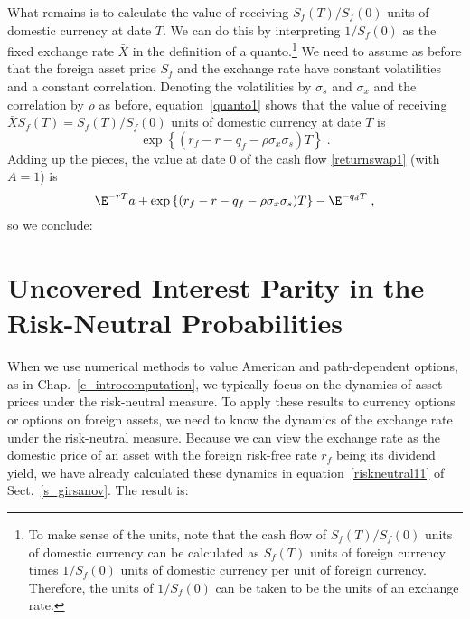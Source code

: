 What remains is to calculate the value of receiving $S_f(T)/S_f(0)$ units of domestic currency at date $T$.  We can do this by interpreting $1/S_f(0)$ as the fixed exchange rate $\bar{X}$ in the definition of a quanto.\footnote{To make sense of the units, note that the cash flow of $S_f(T)/S_f(0)$ units of domestic currency can be calculated as $S_f(T)$ units of foreign currency times $1/S_f(0)$ units of domestic currency per unit of foreign currency.  Therefore, the units of $1/S_f(0)$ can be taken to be the units of an exchange rate.}  We need to assume as before that the foreign asset price $S_f$ and the exchange rate have constant volatilities and a constant correlation.  Denoting the volatilities by $\sigma_s$ and $\sigma_x$ and the correlation by $\rho$ as before, equation~\eqref{quanto1} shows that the value of receiving $\bar{X}S_f(T) = S_f(T)/S_f(0)$ units of domestic currency at date $T$ is
$$\exp\left\{(r_f - r-q_f-\rho\sigma_x\sigma_s)T\right\}\; .$$
Adding up the pieces, the value at date 0 of the cash flow \eqref{returnswap1} (with $A=1$) is
$$\E^{-rT}a + \exp\left\{(r_f - r-q_f-\rho\sigma_x\sigma_s)T\right\} - \E^{-q_dT}\; ,$$
so we conclude:
\section[Uncovered Interest Parity]{Uncovered Interest Parity in the Risk-Neutral Probabilities}

When we use numerical methods to value American and path-dependent options, as in Chap.~\ref{c_introcomputation}, we typically focus on the dynamics of asset prices under the risk-neutral measure.  To apply these results to currency options or options on foreign assets, we need to know the dynamics of the exchange rate under the risk-neutral measure.  Because we can view the exchange rate as the domestic price of an asset with the foreign risk-free rate $r_f$ being its dividend yield, we have already calculated these dynamics in equation~\eqref{riskneutral11} of Sect.~\ref{s_girsanov}.  The result is:

